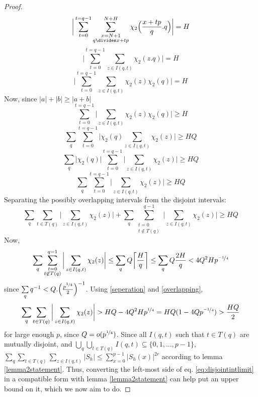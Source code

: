 \documentclass{report}
\begin{document}
\begin{proof}
$$\bigg \lvert\sum\limits_{t=0}^{t=q-1}\sum\limits_{\substack{x=N+1\\q\divides x+tp}}^{N+H} \chi_2 \Big(\frac{x+tp}{q}.q\Big)\bigg \rvert=H$$
$$\bigg \lvert\sum\limits_{t=0}^{t=q-1}\sum\limits_{z\in I(q,t)}\chi_2(z.q)\bigg \rvert=H$$
\begin{equation} \label{chapter3refeq}
\bigg \lvert\sum\limits_{t=0}^{t=q-1}\sum\limits_{z\in I(q,t)}\chi_2(z)\chi_2(q)\bigg \rvert=H
\end{equation}
Now, since $\lvert a\rvert + \lvert b\rvert \geq \lvert a+b \rvert$
$$\sum\limits_{t=0}^{t=q-1}\bigg \lvert\sum\limits_{z\in I(q,t)}\chi_2(z)\chi_2(q)\bigg \rvert \geq H$$
$$\sum_q\sum\limits_{t=0}^{t=q-1}\bigg \lvert\chi_2(q)\sum\limits_{z\in I(q,t)}\chi_2(z)\bigg \rvert \geq HQ$$
$$\sum_q\bigg \lvert\chi_2(q)\bigg\rvert\sum\limits_{t=0}^{t=q-1}\bigg\lvert\sum\limits_{z\in I(q,t)}\chi_2(z)\bigg \rvert \geq HQ$$
$$\sum_q\sum\limits_{t=0}^{t=q-1}\bigg \lvert\sum\limits_{z\in I(q,t)}\chi_2(z)\bigg \rvert \geq HQ$$
Separating the possibly overlapping intervals from the disjoint intervals:
\begin{equation} \label{seperation}
\sum_q\sum\limits_{t\in T(q)}\bigg \lvert\sum\limits_{z\in I(q,t)}\chi_2(z)\bigg \rvert+\sum_q\sum\limits_{\substack{t=0\\t\not \in T(q)}}^{q-1}\bigg \lvert\sum\limits_{z\in I(q,t)}\chi_2(z)\bigg \rvert \geq HQ
\end{equation}
Now,
\begin{equation} \label{overlapping}
\sum_q\sum\limits_{\substack{t=0\\t\not \in T(q)}}^{q-1}\bigg\lvert\sum\limits_{z\in I(q,t) }\chi_2(z)\bigg \rvert \leq \sum\limits_q Q\bigg\lceil\frac{H}{q}\bigg\rceil \leq \sum\limits_q Q\frac{2H}{q} < 4Q^2 Hp^{\nicefrac{-1}{4}}
\end{equation}
since $\sum\limits_q q^{-1} < Q.\Big(\frac{p^{\nicefrac{1}{4}}}{2}\Big)^{-1}$. Using \ref{seperation} and \ref{overlapping},
\begin{equation} \label{eq:disjointintlimit}
\sum_q\sum\limits_{t\in T(q)}\bigg \lvert\sum\limits_{z\in I(q,t)}\chi_2(z)\bigg \rvert > HQ - 4Q^2 Hp^{\nicefrac{1}{4}}=HQ(1-4Qp^{\nicefrac{-1}{4}})>\frac{HQ}{2}
\end{equation}
for large enough $p$, since $Q=o(p^{\nicefrac{1}{4}})$. Since all $I(q,t)$ such that $t\in T(q)$ are mutually disjoint, and $\bigcup\limits_q\bigcup\limits_{t\in T(q)} I(q,t) \subseteq \{0,1,...,p-1\}$, $\sum\limits_q\sum\limits_{t\in T(q)}\sum\limits_{z\in I(q,t)}\lvert S_h \rvert \leq \sum\limits_{x=0}^{p-1}\lvert S_h(x)\rvert ^{2r}$ according to lemma \ref{lemma2statement}. Thus, converting the left-most side of eq. \ref{eq:disjointintlimit} in a compatible form with lemma \ref{lemma2statement} can help put an upper bound on it, which we now aim to do.

\end{proof}
\end{document}
